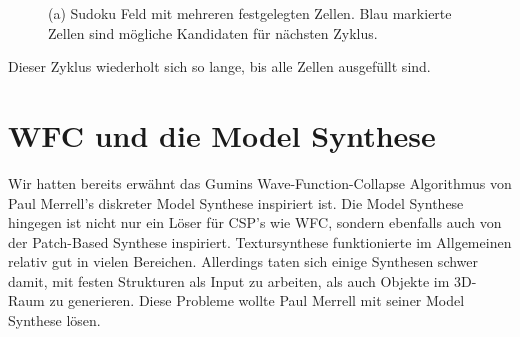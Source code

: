\documentclass[12pt]{report}
\begin{document}
\begin{figure}[H]
    \centering
    \caption{(a) Sudoku Feld mit mehreren festgelegten Zellen. Blau markierte Zellen sind mögliche Kandidaten für nächsten Zyklus.}%
\end{figure}

Dieser Zyklus wiederholt sich so lange, bis alle Zellen ausgefüllt sind.

\section{WFC und die Model Synthese}

Wir hatten bereits erwähnt das Gumins Wave-Function-Collapse Algorithmus von Paul Merrell's diskreter Model Synthese inspiriert ist.
Die Model Synthese hingegen ist nicht nur ein Löser für CSP's wie WFC, sondern ebenfalls auch von der Patch-Based Synthese inspiriert.
Textursynthese funktionierte im Allgemeinen relativ gut in vielen Bereichen.
Allerdings taten sich einige Synthesen schwer damit, mit festen Strukturen als Input zu arbeiten, als auch Objekte im 3D-Raum zu generieren.
Diese Probleme wollte Paul Merrell mit seiner Model Synthese lösen.
\end{document}
